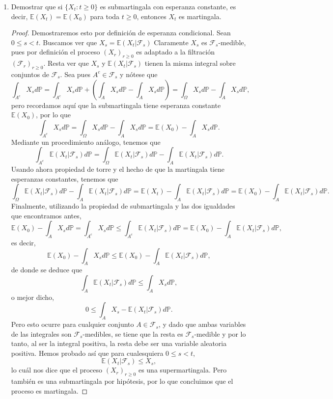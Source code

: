 \documentclass[letterpaper]{article}
\newcommand{\F}{\mathcal{F}}
\newcommand{\E}{\mathbb{E}}
\renewcommand{\P}{\mathbb{P}}
\newcommand{\1}{\mathds{1}}
\theoremstyle{definition}
\theoremstyle{definition}
\theoremstyle{definition}
\theoremstyle{definition}
\theoremstyle{definition}
\begin{document}
\begin{enumerate}
    \item Demostrar que si $\{X_t:t\geq0\}$ es submartingala con esperanza
    constante, es decir, $\E(X_t)=\E(X_0)$ para toda $t\geq0$, entonces
    $X_t$ es martingala.

    \begin{proof}
        Demostraremos esto por definición de esperanza condicional. Sean $0\leq s<t$. Buscamos ver que $X_s=\E \left(X_t|\F_s\right)$
        Claramente $X_s$ es $\F_s$-medible, pues por definición el proceso $(X_r)_{r\geq 0}$ es adaptado a la filtración $(\F_r)_{r\geq0}$.
        Resta ver que $X_s$ y $\E(X_t|\F_s)$ tienen la misma integral sobre conjuntos de $\F_s$. Sea pues $A^{c}\in \F_s$ y nótese que 
        \[
            \int_{A^c} X_s d\P= \int_{A^c} X_sd\P +\left(\int_AX_s d\P-\int_AX_sd\P\right)=\int_\Omega X_sd\P-\int_A X_s d\P,
        \]
        pero recordamos aquí que la submartingala tiene esperanza constante $\E(X_0)$, por lo que
        \[
            \int_{A^c} X_s d\P=\int_\Omega X_sd\P-\int_A X_s d\P=\E(X_0)-\int_A X_s d\P.
        \]
        Mediante un procedimiento análogo, tenemos que
        \[
        \int_{A^c}\E(X_t|\F_s)d\P=\int_\Omega\E(X_t|\F_s)d\P-\int_A \E(X_t|\F_s)d\P.  
        \] 
        Usando ahora propiedad de torre y el hecho de que la martingala tiene esperanzas constantes, tenemos que
        \[
            \int_\Omega\E(X_t|\F_s)d\P-\int_A \E(X_t|\F_s)d\P=\E(X_t)-\int_A \E(X_t|\F_s)d\P=\E(X_0)-\int_A \E(X_t|\F_s)d\P.
        \]
        Finalmente, utilizando la propiedad de submartingala y las dos igualdades que encontramos antes,
        \[
            \E(X_0)-\int_A X_s d\P=\int_{A^c} X_s d\P\leq\int_{A^c}\E(X_t|\F_s)d\P=\E(X_0)-\int_A \E(X_t|\F_s)d\P,
        \]
        es decir,
        \[
            \E(X_0)-\int_A X_s d\P\leq\E(X_0)-\int_A \E(X_t|\F_s)d\P,
        \]
        de donde se deduce que 
        \[
            \int_A \E(X_t|\F_s)d\P\leq\int_A X_s d\P,
        \]
        o mejor dicho, 
        \[
        0\leq \int_A X_s-\E(X_t|\F_s)d\P.    
        \]
        Pero esto ocurre para cualquier conjunto $A\in \F_s$, y dado que ambas variables de las integrales son
        $\F_s$-medibles, se tiene que la resta es $\F_s$-medible y por lo tanto, al ser la integral positiva,
        la resta debe ser una variable aleatoria positiva. Hemos probado así que para cualesquiera $0\leq s<t$,
        \[
            \E(X_t|\F_s)\leq X_s,
        \]
        lo cuál nos dice que el proceso $(X_r)_{r\geq0}$ es una supermartingala. Pero también es una submartingala
        por hipótesis, por lo que concluimos que el proceso es martingala. 

\end{proof}
\end{enumerate}
\end{document}
